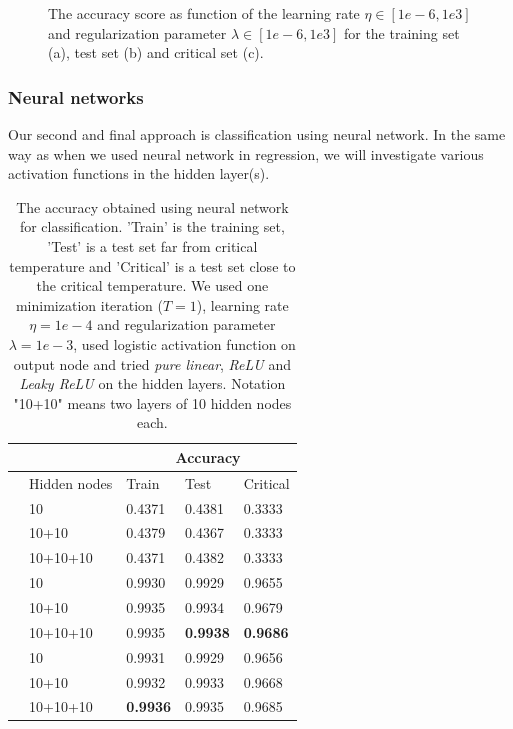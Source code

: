 \begin{figure} [H]
	\caption{The accuracy score as function of the learning rate $\eta\in[1e-6,1e3]$ and regularization parameter $\lambda\in[1e-6,1e3]$ for the training set (a), test set (b) and critical set (c).}%
	\label{fig:class_logistic}
\end{figure}
\restoregeometry

\subsubsection{Neural networks}
Our second and final approach is classification using neural network. In the same way as when we used neural network in regression, we will investigate various activation functions in the hidden layer(s). 
\begin{table} [H]
	\caption{The accuracy obtained using neural network for classification. 'Train' is the training set, 'Test' is a test set far from critical temperature and 'Critical' is a test set close to the critical temperature. We used one minimization iteration ($T=1$), learning rate $\eta=1e-4$ and regularization parameter $\lambda=1e-3$, used logistic activation function on output node and tried \textit{pure linear}, \textit{ReLU} and \textit{Leaky ReLU} on the hidden layers. Notation "10+10" means two layers of 10 hidden nodes each.}
	\begin{tabularx}{\textwidth}{l|l|XXX} \hline\hline
		\label{tab:nn_class}
		&& \multicolumn{3}{c}{\textbf{Accuracy}}\\ \hline
		&Hidden nodes&Train&Test&Critical\\ \hline
		
		\parbox[t]{2mm}{}
		&10 & 0.4371 & 0.4381 & 0.3333 \\
		&10+10 & 0.4379 & 0.4367 & 0.3333 \\
		&10+10+10 & 0.4371 & 0.4382 & 0.3333 \\ \hline
		
		\parbox[t]{2mm}{}
		&10 & 0.9930 & 0.9929 & 0.9655 \\
		&10+10 & 0.9935 & 0.9934 & 0.9679 \\
		&10+10+10 & 0.9935 & \textbf{0.9938} & \textbf{0.9686} \\ \hline
		
		\parbox[t]{2mm}{}
		&10 & 0.9931 & 0.9929 & 0.9656 \\
		&10+10 & 0.9932 & 0.9933 & 0.9668 \\
		&10+10+10 & \textbf{0.9936} & 0.9935 & 0.9685 \\ \hline\hline
	\end{tabularx}
\end{table}

